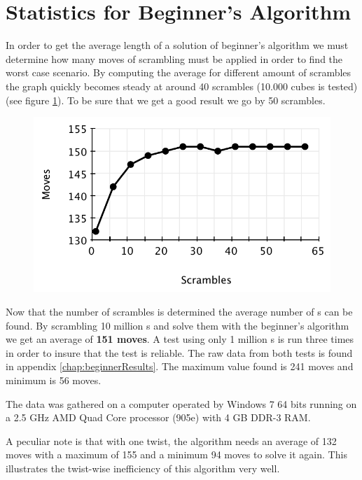 \section{Statistics for Beginner's Algorithm}
\label{sec:beginnersStat}
In order to get the average length of a solution of beginner's algorithm we must determine how many moves of scrambling must be applied in order to find the worst case scenario. 
By computing the average for different amount of scrambles the graph quickly becomes steady at around 40 scrambles (10.000 cubes is tested) (see figure \ref{fig:beginnersScramble}). To be sure that we get a good result we go by 50 scrambles.
\begin{figure}[htbp]
	\centering
		\includegraphics{input/pics/beginnersScramble.pdf}
	\caption{}
	\label{fig:beginnersScramble}
\end{figure}

Now that the number of scrambles is determined the average number of \twist{}s can be found.
By scrambling 10 million \cube{}s and solve them with the beginner's algorithm we get an average of \textbf{151 moves}.
A test using only 1 million \rubik{}s is run three times in order to insure that the test is reliable.
The raw data from both tests is found in appendix \ref{chap:beginnerResults}.
The maximum value found is 241 moves and minimum is 56 moves. 



The data was gathered on a computer operated by Windows 7 64 bits running on a 2.5 GHz AMD Quad Core processor (905e) with 4 GB DDR-3 RAM.

A peculiar note is that with one twist, the algorithm needs an average of 132 moves with a maximum of 155 and a minimum 94 moves to solve it again.
This illustrates the twist-wise inefficiency of this algorithm very well.
